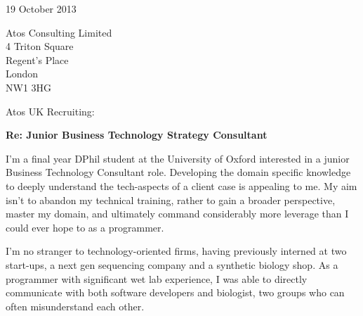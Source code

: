 \documentclass{../res}
\begin{document}
 
\begin{sloppypar}
 
 

\address{2115 Cloville Avenue\\
         Baltimore, MD 21214\\
         \texttt{+}1 443 257 5953}
\address{\texttt{ryan.m.harrison@gmail.com}\\
         \texttt{linkedin.com/in/rmharri}\\
         \texttt{github.com/rmharrison}}
\address{Wolfson College\\ 
         Oxford OX2 6UD\\
         \texttt{+}44 07523 229446}

\begin{resume} 
 
\vspace{2\baselineskip}

19 October 2013
\vspace{1\baselineskip}

Atos Consulting Limited \\
4 Triton Square \\
Regent's Place \\
London \\
NW1 3HG
\vspace{1\baselineskip}

Atos UK Recruiting:

\textbf{Re: Junior Business Technology Strategy Consultant}

I'm a final year DPhil student at the University of Oxford interested in a junior Business Technology Consultant role. Developing the domain specific knowledge to deeply understand the tech-aspects of a client case is appealing to me. My aim isn't to abandon my technical training, rather to gain a broader perspective, master my domain, and ultimately command considerably more leverage than I could ever hope to as a programmer. 

I'm no stranger to technology-oriented firms, having previously interned at two start-ups, a next gen sequencing company and a synthetic biology shop. As a programmer with significant wet lab experience, I was able to directly communicate with both software developers and biologist, two groups who can often misunderstand each other. 


\end{resume}
\end{sloppypar}
\end{document}

